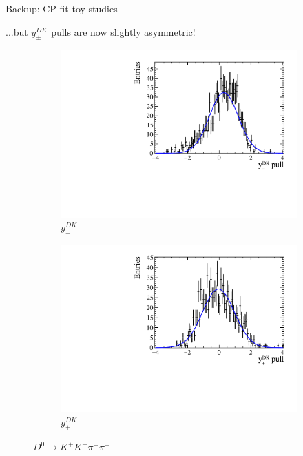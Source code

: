 \documentclass[xcolor={dvipsnames}]{beamer}
\begin{document}
\begin{frame}{Backup: CP fit toy studies}
  \begin{center}
    ...but $y_\pm^{DK}$ pulls are now slightly asymmetric!
  \end{center}
  \begin{figure}
    \centering
    \begin{subfigure}{0.5\textwidth}
      \centering
      \includegraphics[width=1.0\textwidth]{Plots/A_ym_dk_pull.pdf}
      \vspace{-0.3cm}
      \caption*{$y_-^{DK}$}
    \end{subfigure}%
    \begin{subfigure}{0.5\textwidth}
      \centering
      \includegraphics[width=1.0\textwidth]{Plots/A_yp_dk_pull.pdf}
      \vspace{-0.3cm}
      \caption*{$y_+^{DK}$}
    \end{subfigure}
    \caption*{$D^0\to K^+K^-\pi^+\pi^-$}
  \end{figure}
\end{frame}
\end{document}
